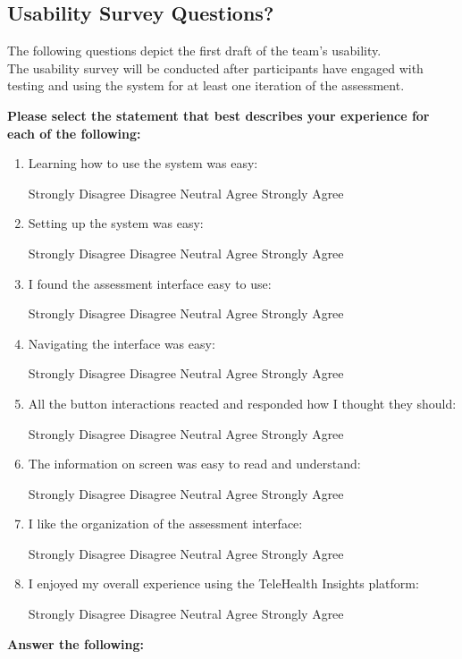 \documentclass[12pt, titlepage]{article}
\begin{document}
\subsection{Usability Survey Questions?}
The following questions depict the first draft of the team's usability.\\
The usability survey will be conducted after participants have engaged with testing and using the system for at least one iteration of the assessment.\\

\newcommand{\likertScale}{
    \begin{center}
        Strongly Disagree \hfill Disagree \hfill Neutral \hfill Agree \hfill Strongly Agree
    \end{center}
}

\newcommand{\insertAnswerHere}{
  \begin{tcolorbox}[width=0.5\textwidth,
    colframe=black,
    colback=white,
    boxrule=0.1mm,
    sharp corners]
  \textit{Insert answer here...}
  \end{tcolorbox}
}

\textbf{Please select the statement that best describes your experience for each of the following:}
\begin{enumerate}
  \item Learning how to use the system was easy:\likertScale
  \item Setting up the system was easy:\likertScale
  \item I found the assessment interface easy to use:\likertScale
  \item Navigating the interface was easy:\likertScale
  \item All the button interactions reacted and responded how I thought they should:\likertScale
  \item The information on screen was easy to read and understand:\likertScale
  \item I like the organization of the assessment interface:\likertScale
  \item I enjoyed my overall experience using the TeleHealth Insights platform:\likertScale
\end{enumerate}
\textbf{Answer the following:}
\end{document}
